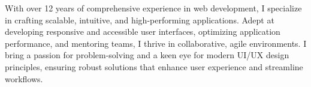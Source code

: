 %
%
%
\par{
With over 12 years of comprehensive experience in web development, I specialize in crafting scalable, intuitive, and high-performing applications. Adept at developing responsive and accessible user interfaces, optimizing application performance, and mentoring teams, I thrive in collaborative, agile environments. I bring a passion for problem-solving and a keen eye for modern UI/UX design principles, ensuring robust solutions that enhance user experience and streamline workflows.
}

